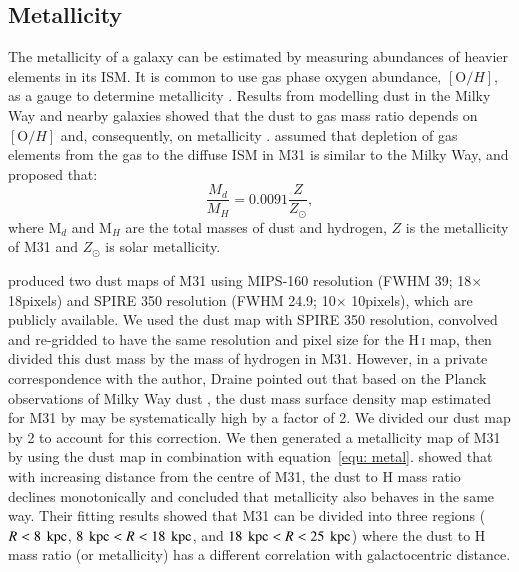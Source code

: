 \subsection{Metallicity}
\label{sec:metal}
 
The metallicity of a galaxy can be estimated by measuring abundances of heavier elements in its ISM. 
It is common to use  gas phase oxygen abundance, $[{\mathrm O/H}]$, as a gauge to determine metallicity \citep[e.g.][]{McGaugh91, Zaritsky94}. 
Results from modelling dust in the Milky Way and nearby galaxies showed that the dust to gas mass ratio depends on $[{\mathrm O/H}]$ and, consequently, on metallicity \citet{Draine07}. \citet{Draine14} assumed that depletion of gas elements from the gas to the diffuse ISM in M31 is similar to the Milky Way, and proposed that: 
 \begin{equation}
 \label{equ: metal}
\frac{M_d}{M_H}=0.0091 \frac{Z}{Z_{\odot}},
 \end{equation} 
\noindent where M$_d$ and M$_H$ are the total masses of dust and hydrogen, $Z$ is the metallicity of M31 and $Z_{\odot}$ is solar metallicity. 

\citet{Draine14} produced two dust maps of M31 using MIPS-160 resolution (FWHM  39\arcsec; 18\arcsec $\times$ 18\arcsec pixels) and SPIRE 350 resolution (FWHM 24\arcsec.9; 10\arcsec $\times$ 10\arcsec pixels), which are publicly available. 
We used the dust map with SPIRE 350 resolution, convolved and re-gridded  to have the same resolution and pixel size for the H\,{\textsc i} map, then divided this dust mass by the mass of hydrogen in M31. 
However, in a private correspondence with the author, Draine pointed out that based on the Planck observations of Milky Way dust \citep{Tauber10}, the dust mass surface density map estimated for M31 by \citet{Draine14} may be systematically high by a factor of 2. We divided our dust map by 2 to account for this correction. 
We then generated a metallicity map of M31 by using the dust map in combination with equation~\ref{equ: metal}. \citet{Draine14} showed that with increasing distance from the centre of M31, the dust to H mass ratio declines monotonically and concluded that metallicity also behaves in the same way. 
Their fitting results showed that M31 can be divided into three regions ($R< 8~\,{\rm kpc}$, $8~\,{\rm kpc} < R < 18~\,{\rm kpc}$, and $18~\,{\rm kpc} < R < 25~\,{\rm kpc}$) where the dust to H mass ratio (or metallicity) has a different correlation with galactocentric distance.
  
